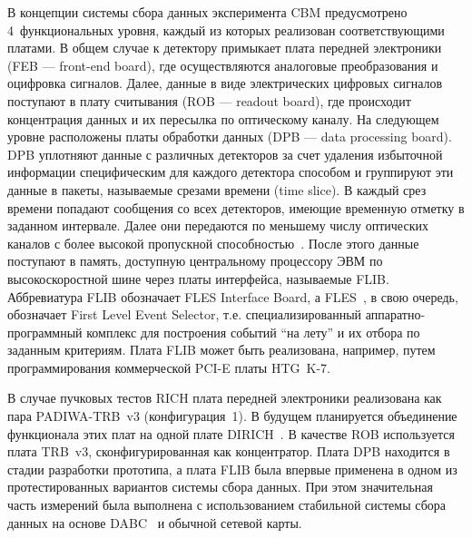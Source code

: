 В концепции системы сбора данных эксперимента CBM предусмотрено 4~функциональных уровня, каждый из которых реализован соответствующими платами. В общем случае к детектору примыкает плата передней электроники (FEB --- front-end board), где осуществляются аналоговые преобразования и оцифровка сигналов. Далее, данные в виде электрических цифровых сигналов поступают в плату считывания (ROB --- readout board), где происходит концентрация данных и их пересылка по оптическому каналу. На следующем уровне расположены платы обработки данных (DPB --- data processing board). DPB уплотняют данные с различных детекторов за счет удаления избыточной информации специфическим для каждого детектора способом и группируют эти данные в пакеты, называемые срезами времени (time slice). В каждый срез времени попадают сообщения со всех детекторов, имеющие временную отметку в заданном интервале. Далее они передаются по меньшему числу оптических каналов с более высокой пропускной способностью~\cite{DPB}. После этого данные поступают в память, доступную центральному процессору ЭВМ по высокоскоростной шине через платы интерфейса, называемые FLIB. Аббревиатура FLIB обозначает FLES Interface Board, а FLES~\cite{FLES}, в свою очередь, обозначает First Level Event Selector, т.е. специализированный аппаратно-программный комплекс для построения событий ``на лету'' и их отбора по заданным критериям. Плата FLIB может быть реализована, например, путем программирования коммерческой PCI-E платы HTG~K-7.

В случае пучковых тестов RICH плата передней электроники реализована как пара PADIWA-TRB~v3 (конфигурация~1). В будущем планируется объединение функционала этих плат на одной плате DIRICH~\cite{DIRICH}. В качестве ROB используется плата TRB~v3, сконфигурированная как концентратор. Плата DPB находится в стадии разработки прототипа, а плата FLIB была впервые применена в одном из протестированных вариантов системы сбора данных. При этом значительная часть измерений была выполнена с использованием стабильной системы сбора данных на основе DABC~\cite{DABC} и обычной сетевой карты.
